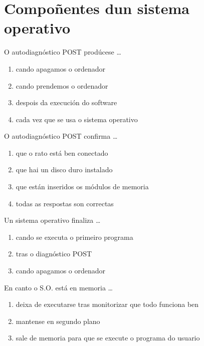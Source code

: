 %
\section{Compoñentes dun sistema operativo}


\begin{diapo}\begin{frame}{O autodiagnóstico POST prodúcese \dots}
\begin{enumerate}
\item cando apagamos o ordenador\pause
\item cando prendemos o ordenador\pause
\item despois da execución do software \pause
\item cada vez que se usa o sistema operativo 
\end{enumerate}
\end{frame} 
\end{diapo} 
\begin{diapo}\begin{frame}{O autodiagnóstico POST confirma \dots}
\begin{enumerate}
\item que o rato está ben conectado \pause
\item que hai un disco duro instalado \pause
\item que están inseridos os módulos de memoria \pause
\item todas as respostas son correctas
\end{enumerate}
\end{frame} 
\end{diapo} 



\begin{diapo}\begin{frame}{Un sistema operativo finaliza  \dots}
\begin{enumerate}
\item cando se executa o primeiro programa\pause
\item tras o diagnóstico POST \pause
\item cando apagamos o ordenador 
\end{enumerate}
\end{frame} 
\end{diapo} 
\begin{diapo}\begin{frame}{ En canto o S.O. está en memoria   \dots}
\begin{enumerate}
	\item deixa de executarse tras monitorizar que todo funciona ben \pause
	\item mantense en segundo plano \pause
	\item sale de memoria para que se execute o programa do usuario 
\end{enumerate} \end{frame} \end{diapo}



